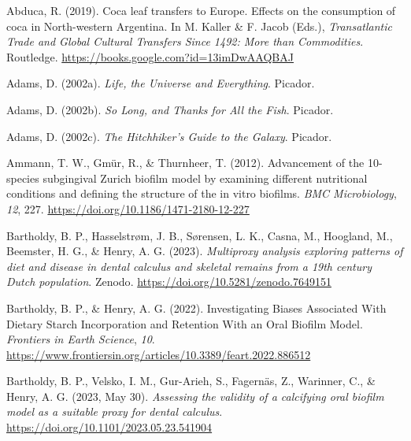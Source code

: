 \documentclass[
  letterpaper,
]{book}
\newlength{\cslhangindent}
\newlength{\cslentryspacingunit} %
\newenvironment{CSLReferences}[2] %
 {%
  \setlength{\parindent}{0pt}
  \ifodd #1
  \let\oldpar\par
  \def\par{\hangindent=\cslhangindent\oldpar}
  \fi
  \setlength{\parskip}{#2\cslentryspacingunit}
 }%
 {}
\begin{document}
\hypertarget{refs-12}{}
\begin{CSLReferences}{1}{0}
\leavevmode{}%
Abduca, R. (2019). Coca leaf transfers to {Europe}. {Effects} on the
consumption of coca in {North-western Argentina}. In M. Kaller \& F.
Jacob (Eds.), \emph{Transatlantic {Trade} and {Global Cultural Transfers
Since} 1492: {More} than {Commodities}}. {Routledge}.
\url{https://books.google.com?id=13imDwAAQBAJ}

\leavevmode{}%
Adams, D. (2002a). \emph{Life, the {Universe} and {Everything}}.
{Picador}.

\leavevmode{}%
Adams, D. (2002b). \emph{So {Long}, and {Thanks} for {All} the {Fish}}.
{Picador}.

\leavevmode{}%
Adams, D. (2002c). \emph{The {Hitchhiker}'s {Guide} to the {Galaxy}}.
{Picador}.

\leavevmode{}%
Ammann, T. W., Gmür, R., \& Thurnheer, T. (2012). Advancement of the
10-species subgingival {Zurich} biofilm model by examining different
nutritional conditions and defining the structure of the in vitro
biofilms. \emph{BMC Microbiology}, \emph{12}, 227.
\url{https://doi.org/10.1186/1471-2180-12-227}

\leavevmode{}%
Bartholdy, B. P., Hasselstrøm, J. B., Sørensen, L. K., Casna, M.,
Hoogland, M., Beemster, H. G., \& Henry, A. G. (2023). \emph{Multiproxy
analysis exploring patterns of diet and disease in dental calculus and
skeletal remains from a 19th century {Dutch} population}. {Zenodo}.
\url{https://doi.org/10.5281/zenodo.7649151}

\leavevmode{}%
Bartholdy, B. P., \& Henry, A. G. (2022). Investigating {Biases
Associated With Dietary Starch Incorporation} and {Retention With} an
{Oral Biofilm Model}. \emph{Frontiers in Earth Science}, \emph{10}.
\url{https://www.frontiersin.org/articles/10.3389/feart.2022.886512}

\leavevmode{}%
Bartholdy, B. P., Velsko, I. M., Gur-Arieh, S., Fagernäs, Z., Warinner,
C., \& Henry, A. G. (2023, May 30). \emph{Assessing the validity of a
calcifying oral biofilm model as a suitable proxy for dental calculus}.
\url{https://doi.org/10.1101/2023.05.23.541904}


\end{CSLReferences}
\end{document}
